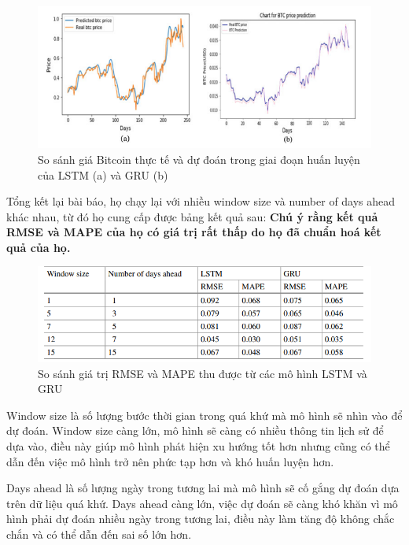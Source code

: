 \begin{figure}[h!]
    \centering
    \includegraphics[width=\textwidth]{images/chapter5/hinh5.png}
    \caption{So sánh giá Bitcoin thực tế và dự đoán trong giai đoạn huấn luyện của LSTM (a) và GRU (b)}
    \label{fig:hinh5}
\end{figure}

\newpage

Tổng kết lại bài báo, họ chạy lại với nhiều window size và number of days ahead khác nhau, từ đó họ cung cấp được bảng kết quả sau: 
\textbf{Chú ý rằng kết quả RMSE và MAPE của họ có giá trị rất thấp do họ đã chuẩn hoá kết quả của họ.} 

\begin{figure}[h!]
    \centering
    \includegraphics[width=\textwidth]{images/chapter5/res.png}
    \caption{So sánh giá trị RMSE và MAPE thu được từ các mô hình LSTM và GRU}
    \label{fig:res}
\end{figure}

Window size là số lượng bước thời gian trong quá khứ mà mô hình sẽ nhìn vào để dự đoán. Window size càng lớn, mô hình sẽ càng có nhiều thông tin lịch sử để dựa vào, điều này giúp mô hình phát hiện xu hướng tốt hơn nhưng cũng có thể dẫn đến việc mô hình trở nên phức tạp hơn và khó huấn luyện hơn.

Days ahead là số lượng ngày trong tương lai mà mô hình sẽ cố gắng dự đoán dựa trên dữ liệu quá khứ. Days ahead càng lớn, việc dự đoán sẽ càng khó khăn vì mô hình phải dự đoán nhiều ngày trong tương lai, điều này làm tăng độ không chắc chắn và có thể dẫn đến sai số lớn hơn.

